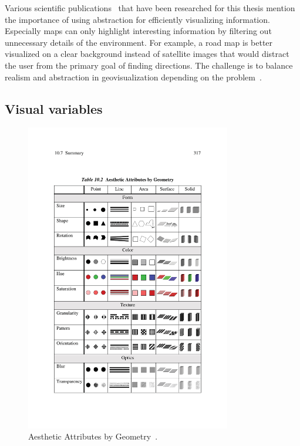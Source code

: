 Various scientific publications~\cite{phillips82clutter, MACEACHREN90apattern, keim2001vis, harvey2008primer, ellis08clutter, Delort10vis, noellenburg11geovis} that have been researched for this thesis mention the importance of using abstraction for efficiently visualizing information. Especially maps can only highlight interesting information by filtering out unnecessary details of the environment. For example, a road map is better visualized on a clear background instead of satellite images that would distract the user from the primary goal of finding directions. The challenge is to balance realism and abstraction in geovisualization depending on the problem~\cite{noellenburg11geovis}.

\subsection{Visual variables}

\begin{figure}[h]
  \begin{center}
    \includegraphics[width=0.8\textwidth]{figures/aesthetic_attributes.pdf}
    \caption{Aesthetic Attributes by Geometry~\cite{Wilkinson05grammar}.}
    \label{fig:aesthetic-attributes}
  \end{center}
\end{figure}


